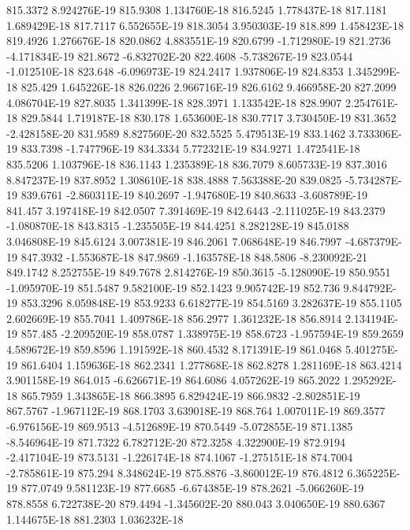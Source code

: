 815.3372  8.924276E-19
815.9308  1.134760E-18
816.5245  1.778437E-18
817.1181  1.689429E-18
817.7117  6.552655E-19
818.3054  3.950303E-19
818.899  1.458423E-18
819.4926  1.276676E-18
820.0862  4.883551E-19
820.6799  -1.712980E-19
821.2736  -4.171834E-19
821.8672  -6.832702E-20
822.4608  -5.738267E-19
823.0544  -1.012510E-18
823.648  -6.096973E-19
824.2417  1.937806E-19
824.8353  1.345299E-18
825.429  1.645226E-18
826.0226  2.966716E-19
826.6162  9.466958E-20
827.2099  4.086704E-19
827.8035  1.341399E-18
828.3971  1.133542E-18
828.9907  2.254761E-18
829.5844  1.719187E-18
830.178  1.653600E-18
830.7717  3.730450E-19
831.3652  -2.428158E-20
831.9589  8.827560E-20
832.5525  5.479513E-19
833.1462  3.733306E-19
833.7398  -1.747796E-19
834.3334  5.772321E-19
834.9271  1.472541E-18
835.5206  1.103796E-18
836.1143  1.235389E-18
836.7079  8.605733E-19
837.3016  8.847237E-19
837.8952  1.308610E-18
838.4888  7.563388E-20
839.0825  -5.734287E-19
839.6761  -2.860311E-19
840.2697  -1.947680E-19
840.8633  -3.608789E-19
841.457  3.197418E-19
842.0507  7.391469E-19
842.6443  -2.111025E-19
843.2379  -1.080870E-18
843.8315  -1.235505E-19
844.4251  8.282128E-19
845.0188  3.046808E-19
845.6124  3.007381E-19
846.2061  7.068648E-19
846.7997  -4.687379E-19
847.3932  -1.553687E-18
847.9869  -1.163578E-18
848.5806  -8.230092E-21
849.1742  8.252755E-19
849.7678  2.814276E-19
850.3615  -5.128090E-19
850.9551  -1.095970E-19
851.5487  9.582100E-19
852.1423  9.905742E-19
852.736  9.844792E-19
853.3296  8.059848E-19
853.9233  6.618277E-19
854.5169  3.282637E-19
855.1105  2.602669E-19
855.7041  1.409786E-18
856.2977  1.361232E-18
856.8914  2.134194E-19
857.485  -2.209520E-19
858.0787  1.338975E-19
858.6723  -1.957594E-19
859.2659  4.589672E-19
859.8596  1.191592E-18
860.4532  8.171391E-19
861.0468  5.401275E-19
861.6404  1.159636E-18
862.2341  1.277868E-18
862.8278  1.281169E-18
863.4214  3.901158E-19
864.015  -6.626671E-19
864.6086  4.057262E-19
865.2022  1.295292E-18
865.7959  1.343865E-18
866.3895  6.829424E-19
866.9832  -2.802851E-19
867.5767  -1.967112E-19
868.1703  3.639018E-19
868.764  1.007011E-19
869.3577  -6.976156E-19
869.9513  -4.512689E-19
870.5449  -5.072855E-19
871.1385  -8.546964E-19
871.7322  6.782712E-20
872.3258  4.322900E-19
872.9194  -2.417104E-19
873.5131  -1.226174E-18
874.1067  -1.275151E-18
874.7004  -2.785861E-19
875.294  8.348624E-19
875.8876  -3.860012E-19
876.4812  6.365225E-19
877.0749  9.581123E-19
877.6685  -6.674385E-19
878.2621  -5.066260E-19
878.8558  6.722738E-20
879.4494  -1.345602E-20
880.043  3.040650E-19
880.6367  1.144675E-18
881.2303  1.036232E-18
